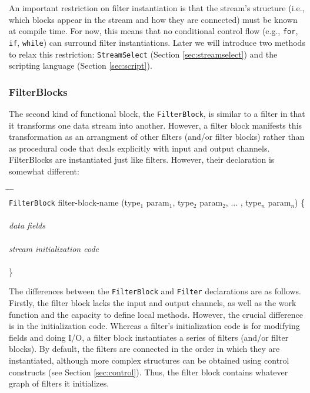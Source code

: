 An important restriction on filter instantiation is that the stream's
structure (i.e., which blocks appear in the stream and how they are
connected) must be known at compile time.  For now, this means that no
conditional control flow (e.g., {\tt for}, {\tt if}, {\tt while}) can
surround filter instantiations.  Later we will introduce two methods
to relax this restriction: {\tt StreamSelect} (Section
\ref{sec:streamselect}) and the scripting language (Section
\ref{sec:script}).

\subsubsection{FilterBlocks}

The second kind of functional block, the {\tt FilterBlock}, is similar
to a filter in that it transforms one data stream into another.
However, a filter block manifests this transformation as an arrangment
of other filters (and/or filter blocks) rather than as procedural code
that deals explicitly with input and output channels.  FilterBlocks
are instantiated just like filters.  However, their declaration is
somewhat different:

\begin{tabbing}
\hspace{0.2in} \= \hspace{0.2in} \= \hspace{0.2in} \= \hspace{0.2in} \= \\

{\tt FilterBlock} filter-block-name (type$_1$ param$_1$, type$_2$ param$_2$,
... , type$_n$ param$_n$) \{ \\ \\

\> {\it data fields} \\ \\

\> {\it stream initialization code} \\ \\

\}
\end{tabbing}

The differences between the {\tt FilterBlock} and {\tt Filter}
declarations are as follows.  Firstly, the filter block lacks the
input and output channels, as well as the work function and the
capacity to define local methods.  However, the crucial difference is
in the initialization code.  Whereas a filter's initialization code is
for modifying fields and doing I/O, a filter block instantiates a
series of filters (and/or filter blocks).  By default, the filters are
connected in the order in which they are instantiated, although more
complex structures can be obtained using control constructs (see
Section {\ref{sec:control}}).  Thus, the filter block contains whatever
graph of filters it initializes.  

